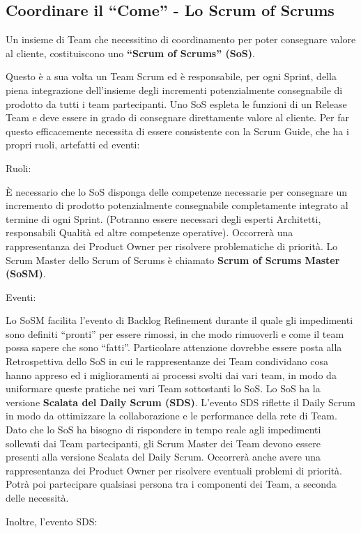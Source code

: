 \documentclass[italian,12pt,a4paper,parskip=full]{scrartcl}
\begin{document}
\subsection{Coordinare il ``Come'' - Lo Scrum of Scrums}
Un insieme di Team che necessitino di coordinamento per poter consegnare valore al cliente, costituiscono uno \textbf{``Scrum of Scrums'' (SoS)}.

Questo è a sua volta un Team Scrum ed è responsabile, per ogni Sprint, della piena integrazione dell'insieme degli incrementi potenzialmente consegnabile di prodotto da tutti i team partecipanti. Uno SoS espleta le funzioni di un Release Team e deve essere in grado di consegnare direttamente valore al cliente. Per far questo efficacemente necessita di essere consistente con la Scrum Guide, che ha i propri ruoli, artefatti ed eventi:

Ruoli:

È necessario che lo SoS disponga delle competenze necessarie per consegnare un incremento di prodotto potenzialmente consegnabile completamente integrato al termine di ogni Sprint. (Potranno essere necessari degli esperti Architetti, responsabili Qualità ed altre competenze operative). Occorrerà una rappresentanza dei Product Owner per risolvere problematiche di priorità. Lo Scrum Master dello Scrum of Scrums è chiamato \textbf{Scrum of Scrums Master (SoSM)}.

Eventi:

Lo SoSM facilita l'evento di Backlog Refinement durante il quale gli impedimenti sono definiti ``pronti'' per essere rimossi, in che modo rimuoverli e come il team possa sapere che sono ``fatti''. Particolare attenzione dovrebbe essere posta alla Retrospettiva dello SoS in cui le rappresentanze dei Team condividano cosa hanno appreso ed i miglioramenti ai processi svolti dai vari team, in modo da uniformare queste pratiche nei vari Team sottostanti lo SoS.
Lo SoS ha la versione \textbf{Scalata del Daily Scrum (SDS)}. L'evento SDS riflette il Daily Scrum in modo da ottimizzare la collaborazione e le performance della rete di Team. Dato che lo SoS ha bisogno di rispondere in tempo reale agli impedimenti sollevati dai Team partecipanti, gli Scrum Master dei Team devono essere presenti alla versione Scalata del Daily Scrum. Occorrerà anche avere una rappresentanza dei Product Owner per risolvere eventuali problemi di priorità. Potrà poi partecipare qualsiasi persona tra i componenti dei Team, a seconda delle necessità.

Inoltre, l'evento SDS:
\end{document}
